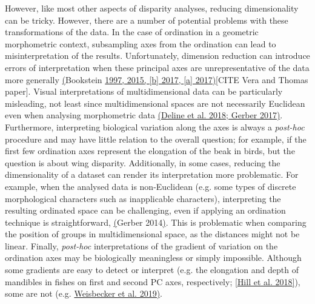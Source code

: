 However, like most other aspects of disparity analyses, reducing dimensionality can be tricky.
However, there are a number of potential problems with these transformations of the data.
In the case of ordination in a geometric morphometric context, subsampling axes from the ordination can lead to misinterpretation of the results. %
Unfortunately, dimension reduction can introduce errors of interpretation when these principal axes are unrepresentative of the data more generally \href{https://paperpile.com/c/sTGYvp/1SD2+sN5d+xaUx+o4w7}{(}Bookstein \href{https://paperpile.com/c/sTGYvp/1SD2+sN5d+xaUx+o4w7}{1997, 2015, {[}b{]} 2017, {[}a{]} 2017)}{[}CITE Vera and Thomas paper{]}. %
Visual interpretations of multidimensional data can be particularly misleading, not least since multidimensional spaces are not necessarily Euclidean even when analysing morphometric data \href{https://paperpile.com/c/sTGYvp/0y4V+QVvv}{(Deline et al. 2018; Gerber 2017)}.
Furthermore, interpreting biological variation along the axes is always a \emph{post-hoc} procedure and may have little relation to the overall question; for example, if the first few ordination axes represent the elongation of the beak in birds, but the question is about wing disparity.
Additionally, in some cases, reducing the dimensionality of a dataset can render its interpretation more problematic.
For example, when the analysed data is non-Euclidean (e.g. some types of discrete morphological characters such as inapplicable characters), interpreting the resulting ordinated space can be challenging, even if applying an ordination technique is straightforward, \href{https://paperpile.com/c/sTGYvp/SJbC}{(}Gerber 2014\href{https://paperpile.com/c/sTGYvp/SJbC}{)}. %
This is problematic when comparing the position of groups in multidimensional space, as the distances might not be linear.
Finally, \emph{post-hoc} interpretations of the gradient of variation on the ordination axes may be biologically meaningless or simply impossible. %
Although some gradients are easy to detect or interpret (e.g. the elongation and depth of mandibles in fishes on first and second PC axes, respectively; {[}\href{https://paperpile.com/c/sTGYvp/3JPy}{Hill et al. 2018{]}}), some are not (e.g. \href{https://paperpile.com/c/sTGYvp/TZzO}{Weisbecker et al. 2019)}.
